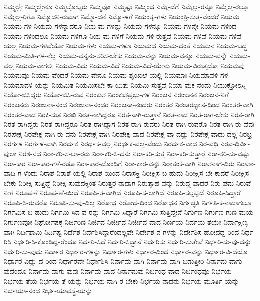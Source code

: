 {ನಿಮ್ಮಲ್ಲೇ
ನಿಮ್ಮಲ್ಲೇನೂ
ನಿಮ್ಮಲ್ಲೊಬ್ಬರು
ನಿಮ್ಮವೋ
ನಿಮ್ಮಷ್ಟು
ನಿಮ್ಮಿಂದ
ನಿಮ್ಮೆ-ಡೆಗೆ
ನಿಮ್ಮೆಲ್ಲ-ರನ್ನೂ
ನಿಮ್ಮೆಲ್ಲ-ರಲ್ಲೂ
ನಿಮ್ಮೆಲ್ಲ-ರಿಗೂ
ನಿಮ್ಮೊಡನಿ-ರುವಾಗ
ನಿಮ್ಮೊ-ಡನೆ
ನಿಮ್ಮೊ-ಳಗೆ
ನಿಯಂತೃ-ಗಳು
ನಿಯಂತ್ರಿ-ಸುತ್ತ-ವೆಂದರೆ
ನಿಯಮ
ನಿಯಮ-ಗಳ
ನಿಯಮ-ಗಳನ್ನಾದರೂ
ನಿಯ-ಮ-ಗಳನ್ನು
ನಿಯಮ-ಗಳನ್ನೂ
ನಿಯಮ-ಗಳನ್ನೇ
ನಿಯಮ-ಗಳಿಂದ
ನಿಯಮ-ಗಳಿಂದಲೂ
ನಿಯಮ-ಗಳಿಗೂ
ನಿಯ-ಮ-ಗಳಿಗೆ
ನಿಯಮ-ಗಳಿ-ರುತ್ತವೆ
ನಿಯಮ-ಗಳಿವೆ
ನಿಯಮ-ಗಳಿವೆ-ಯಲ್ಲ
ನಿಯಮ-ಗಳಿವೆಯೋ
ನಿಯಮ-ಗಳು
ನಿಯಮ-ಗಳೂ
ನಿಯಮದ
ನಿಯಮ-ದಂತೆ
ನಿಯಮನ
ನಿಯಮ-ಬದ್ಧ
ನಿಯಮ-ಮಿತಿ-ಗಳ-ನೆಲ್ಲ
ನಿಯಮ-ವನ್ನನು-ಸರಿಸ-ಬೇಕು
ನಿಯಮ-ವನ್ನು
ನಿಯಮ-ವನ್ನೂ
ನಿಯಮ-ವನ್ನೇ
ನಿಯಮ-ವಲ್ಲ
ನಿಯಮ-ವಾಗಲೀ
ನಿಯಮ-ವಿದು
ನಿಯಮ-ವಿದೆ
ನಿಯಮ-ವಿದೆ-ಯೇನು
ನಿಯಮ-ವಿರುತ್ತದೋ
ನಿಯಮವು
ನಿಯಮವೂ
ನಿಯಮ-ವೆಂದರೆ
ನಿಯಮ-ವೇನೂ
ನಿಯಮ-ಶೃಂಖಲೆ-ಯಲ್ಲಿ
ನಿಯಮಾಃ
ನಿಯಮಾವಳಿ-ಗಳ
ನಿಯಮಾವಳಿ-ಯನ್ನು
ನಿಯಮಿತ
ನಿಯಮಿಸಬೇ-ಕಾ-ಯಿತು
ನಿಯಮಿ-ಸುತ್ತವೆ
ನಿಯಾ-ಮಕ-ನೆಂದು
ನಿಯುಕ್ತೋಽಸ್ಮಿ
ನಿಯೋ-ಜಿಸಿದ್ದರು
ನಿಯೋ-ಜಿಸಿ-ರುವ
ನಿರಂಕುಶ
ನಿರಂಕುಶಪ್ರಭು-ಗಳ
ನಿರಂಜನ
ನಿರಂಜನನ
ನಿರಂಜನ-ನಿಗೆ
ನಿರಂಜನರು
ನಿರಂಜನಾ-ನಂದ
ನಿರಂಜನಾ-ನಂದರ
ನಿರಂಜನಾ-ನಂದರು
ನಿರಂತರ
ನಿರಂತರಧ್ಯಾನ-ದಿಂದ
ನಿರಂತರ-ವಾಗಿ
ನಿರಂತರ-ವಾದ
ನಿರಕಿ-ಸುತ
ನಿರಖಿ
ನಿರತ-ನಾಗಿದ್ದರೂ
ನಿರತ-ನಾಗಿ-ರುತ್ತಾನೆ
ನಿರತ-ನಾದ
ನಿರತ-ರಾಗ-ಬೇಕು
ನಿರತ-ರಾಗಿ
ನಿರತ-ರಾಗಿದ್ದರು
ನಿರತ-ರಾಗಿದ್ದರೂ
ನಿರತ-ರಾಗಿದ್ದಾಗ
ನಿರತ-ರಾಗಿ-ರುವರು
ನಿರತ-ರಾಗಿ-ರುವರೊ
ನಿರತ-ರಾಗಿ-ರು-ವೆವು
ನಿರಪೇಕ್ಷ
ನಿರಪೇಕ್ಷ-ನಾಗಿ-ರು-ವನು
ನಿರಪೇಕ್ಷ-ವಾಗಿ
ನಿರಪೇಕ್ಷ-ವಾದ
ನಿರಪೇಕ್ಷ-ವಾ-ದದ್ದು
ನಿರಪೇಕ್ಷ-ವಾದು-ದಲ್ಲ
ನಿರಭ್ರ
ನಿರರ್ಗಳ
ನಿರರ್ಗಳ-ವಾಗಿ
ನಿರರ್ಥಕ
ನಿರರ್ಥಕ-ವಲ್ಲ
ನಿರರ್ಥಕ-ವಲ್ಲ-ವೆಂದು
ನಿರರ್ಥಕ-ವಾದ
ನಿರ-ವಧಿ
ನಿರವ-ಧಿರ್ವಿ-ಪುಲಾ
ನಿರಶ-ನದ
ನಿರಾ-ಕರಿ-ಸ-ಲಾ-ರರು
ನಿರಾ-ಕರಿ-ಸಿ-ದನು
ನಿರಾ-ಕರಿ-ಸುತ್ತ
ನಿರಾ-ಕರಿ-ಸುತ್ತಾರೆ
ನಿರಾ-ಕರಿ-ಸು-ವಷ್ಟು
ನಿರಾ-ಕಾರ
ನಿರಾ-ಕಾರ-ಗಳೆ-ರಡೂ
ನಿರಾ-ಕಾರ-ದೊಂದಿಗೆ
ನಿರಾ-ಕಾರ-ವನ್ನು
ನಿರಾತಂಕ-ವಾಗಿ
ನಿರಾಶನಾಗ-ದಿರು
ನಿರಾಶಾ-ವಾದಿ-ಗ-ಳೆಂದು
ನಿರಾಶೆ
ನಿರಾಶೆ-ಯಲ್ಲಿ
ನಿರಾಶೆ-ಯಿಂದ
ನಿರಾಸಕ್ತಿ
ನಿರೀಕ್ಷಿಸ-ಬ-ಹುದು
ನಿರೀಕ್ಷಿಸ-ಬೇ-ಕಾದರೆ
ನಿರೀಕ್ಷಿಸ-ಬೇಕು
ನಿರೀಕ್ಷಿ-ಸುತ್ತಿದ್ದೆ
ನಿರೀಕ್ಷಿ-ಸುವುದಕ್ಕಿಂತ
ನಿರುತ್ತರ-ನಾದಾಗ
ನಿರುತ್ಸಾಹ-ವನ್ನು
ನಿರುದ್ಧ-ವಾದರೆ
ನಿರು-ಪಮ
ನಿರುವೆ-ನೀಗ
ನಿರೂಪಣೆ
ನಿರೂಪ-ಣೆ-ಯಿದೆ
ನಿರೂಪಿ-ತ-ವಾಗಿದೆ
ನಿರೂಪಿ-ಸ-ಲಾಗಿದೆ
ನಿರೂಪಿ-ಸಲ್ಪಟ್ಟಿದೆ
ನಿರೂಪಿ-ಸಿದ್ದಾರೆ
ನಿರೂಪಿ-ಸಿ-ರುವರೊ
ನಿರೂಪಿ-ಸು-ವು-ದಿಲ್ಲ
ನಿರೋಧ
ನಿರೋಧ-ದಿಂದ
ನಿರೋಧನ
ನಿರ್ಗಚ್ಛತಿ
ನಿರ್ಗತಿ-ಕ-ನಾದಾಗಲೂ
ನಿರ್ಗಮಿಸ-ಬ-ಹುದು
ನಿರ್ಗಮಿ-ಸಿದ-ವ-ರನ್ನು
ನಿರ್ಗಮಿ-ಸಿದ್ದಾರೆ
ನಿರ್ಗಮಿ-ಸುತ್ತಿದ್ದೇನೆ
ನಿರ್ಗುಣ
ನಿರ್ಗುಣ-ಗುಣ-ಮಯ
ನಿರ್ಗುಣವೋ
ನಿರ್ಘೋಷಕ್ಕೆ
ನಿರ್ಜರಿಣಿ
ನಿರ್ಜಿವ
ನಿರ್ಜೀವ
ನಿರ್ಜೀವ-ವಾದ
ನಿರ್ಣಯ
ನಿರ್ದಯ-ತೆಯೇ
ನಿರ್ದಾಕ್ಷಿಣ್ಯ-ವಾಗಿ
ನಿರ್ದಿಶಾಮಿ
ನಿರ್ದಿಷ್ಟ
ನಿರ್ದೆಶ
ನಿರ್ದೆಶಿಸಿದ್ದಾರೆಂದಲ್ಲವೇ
ನಿರ್ದೇಶ-ನ-ಗಳನ್ನು
ನಿರ್ದೇಶಿಸ-ಹೋದದ್ದ-ರಿಂದ
ನಿರ್ಧ-ರಿಸಿ
ನಿರ್ಧರಿ-ಸಿ-ಕೊಂಡಿದ್ದ-ರೆಂದೂ
ನಿರ್ಧರಿ-ಸಿದೆ
ನಿರ್ಧರಿ-ಸಿದ್ದಾನೆ
ನಿರ್ಧರಿಸು
ನಿರ್ಧರಿ-ಸುತ್ತೇವೆ
ನಿರ್ಧರಿ-ಸು-ವು-ದನ್ನು
ನಿರ್ಧರಿ-ಸು-ವುದು
ನಿರ್ಧಾರ
ನಿರ್ಧಾರ-ಗಳನ್ನು
ನಿರ್ಧಾರ-ಗಳು
ನಿರ್ಧಾರ-ದಿಂದ
ನಿರ್ಧಾರ-ವನ್ನು
ನಿರ್ಧಾರ-ವಿ-ದೆಯೊ
ನಿರ್ಧಾರ-ವಿದ್ದು-ದ-ರಿಂದ
ನಿರ್ಧಾರವೇ
ನಿರ್ಧೇಶಿಸಿ
ನಿರ್ನಾಮ-ವಾಗಿ
ನಿರ್ನಾಮ-ವಾಗಿ-ಬಿಡುತ್ತೀರಿ
ನಿರ್ನಾಮ-ವಾಗು-ವುದೆಂದೂ
ನಿರ್ನಾಮ-ವಾಗು-ವುವು
ನಿರ್ನಾಮ-ವಾದ
ನಿರ್ನಾಮವು
ನಿರ್ಬಂಧ-ವಾದ
ನಿರ್ಬಂಧವೂ
ನಿರ್ಭಯ
ನಿರ್ಭಯ-ತೆಯ
ನಿರ್ಭಯ-ತೆ-ಯನ್ನು
ನಿರ್ಭಯ-ನಾಗಿ-ರ-ಬೇಕು
ನಿರ್ಭಯ-ನಾದನು
ನಿರ್ಭಯ-ಮೂರ್ತಿ-ಯನ್ನು
ನಿರ್ಭಯಾ-ನಂದ
ನಿರ್ಭ-ಯಾವಸ್ಥೆ-ಯನ್ನು
}
